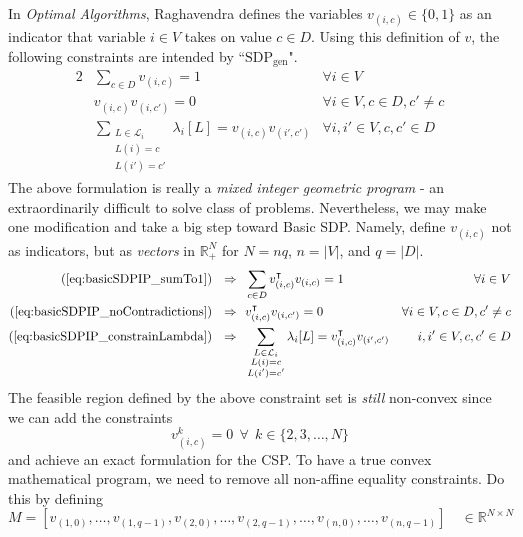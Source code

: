 \documentclass[letterpaper, 12pt]{article}
\numberwithin{equation}{section}
\begin{document}
In \textit{Optimal Algorithms}, Raghavendra defines the variables $v_{(i,c)} \in  \{0,1\}$ as an indicator that variable $i \in V$ takes on value $c \in D$. Using this definition of $v$, the following constraints are intended by ``$\text{SDP}_{\text{gen}}$".
\begin{alignat}{2}
&\sum_{c \in D} v_{(i,c)} = 1 & \forall i \in V \label{eq:basicSDPIP_sumTo1} \\
&v_{(i,c)}v_{(i,c')} = 0        & \forall i \in V , c \in D, c' \neq c \label{eq:basicSDPIP_noContradictions} \\
&\sum_{\substack{L \in \mathcal{L}_i \\ L(i) = c \\ L(i') = c' }} \lambda_i[L] = v_{(i,c)}v_{(i',c')} & \forall i,i' \in V, c,c' \in D \label{eq:basicSDPIP_constrainLambda}
\end{alignat}
The above formulation is really a \textit{mixed integer geometric program} - an extraordinarily difficult to solve class of problems. Nevertheless, we may make one modification and take a big step toward Basic SDP. Namely, define $v_{(i,c)}$ not as indicators, but as \textit{vectors} in $\mathbb{R}^{N}_+$ for $N = n q$, $n = |V|$, and $q = |D|$.
\begin{alignat}{2}
(\ref{eq:basicSDPIP_sumTo1}) ~~\Rightarrow & ~~\sum_{c \in D} v_{(i,c)}^\intercal v_{(i,c)} = 1 & \forall i \in V \label{eq:basicSDPnearCVX_sumTo1} \\
(\ref{eq:basicSDPIP_noContradictions}) ~~\Rightarrow &~~v_{(i,c)}^\intercal v_{(i,c')} = 0 & \forall i \in V, c \in D, c' \neq c \label{eq:basicSDPnearCVX_noContradictions} \\
(\ref{eq:basicSDPIP_constrainLambda})~~ \Rightarrow & ~~\sum_{\substack{L \in \mathcal{L}_i \\ L(i) = c \\ L(i') = c' }} \lambda_i[L] = v_{(i,c)}^\intercal v_{(i',c')} &  i,i' \in V, c,c' \in D \label{eq:basicSDPnearCVX_constrainLambda}
\end{alignat}
The feasible region defined by the above constraint set is \textit{still} non-convex since we can add the constraints
\begin{equation}
v^k_{(i,c)} = 0 ~~ \forall ~~ k \in \{2,3,\ldots,N\} 
\end{equation}
and achieve an exact formulation for the CSP. To have a true convex mathematical program, we need to remove all non-affine equality constraints. Do this by defining
\begin{equation}
M = [v_{(1,0)},\ldots,v_{(1,q-1)},
	v_{(2,0)},\ldots,v_{(2,q-1)},\ldots,
	v_{(n,0)},\ldots,v_{(n,q-1)}] \quad  \in \mathbb{R}^{N \times N}
\end{equation}
\end{document}
